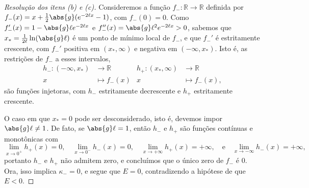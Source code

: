 \begin{proof}[Resolução dos itens (b) e (c)]
    Consideremos a função \(f_- : \mathbb{R} \to \mathbb{R}\) definida por \(f_-(x) = x + \frac12\abs{g}(e^{-2\ell x}- 1)\), com \(f_-(0) = 0\). Como \(f'_-(x) = 1 - \abs{g} \ell e^{-2 \ell x}\) e \(f_-''(x) = \abs{g} \ell^2 e^{-2 \ell x} > 0\), sabemos que \(x_* = \frac{1}{2\ell}\ln(\abs{g} \ell)\) é um ponto de mínimo local de \(f_-\), e que \(f_-'\) é estritamente crescente, com \(f_-'\) positiva em \((x_*, \infty)\) e negativa em \((-\infty, x_*)\). Isto é, as restrições de \(f_-\) a esses intervalos,
    \begin{align*}
        h_- : (-\infty, x_*) &\to \mathbb{R} &
        h_+ : (x_*, \infty) &\to \mathbb{R}\\
                          x &\mapsto f_-(x)&
                          x &\mapsto f_-(x),
    \end{align*}
    são funções injetoras, com \(h_-\) estritamente decrescente e \(h_+\) estritamente crescente.

    O caso em que \(x_* = 0\) pode ser desconsiderado, isto é, devemos impor \(\abs{g} \ell \neq 1\). De fato, se \(\abs{g}\ell = 1\), então \(h_-\) e \(h_+\) são funções contínuas e monotônicas com
    \begin{equation*}
        \lim_{x \to 0^+}{h_+(x)} = 0,\quad
        \lim_{x \to 0^-}{h_-(x)} = 0,\quad
        \lim_{x \to +\infty}{h_+(x)} = +\infty,\quad\text{e}\quad
        \lim_{x \to -\infty}{h_-(x)} = +\infty,
    \end{equation*}
    portanto \(h_-\) e \(h_+\) não admitem zero, e concluímos que o único zero de \(f_-\) é 0. Ora, isso implica \(\kappa_- = 0\), e segue que \(E = 0\), contradizendo a hipótese de que \(E < 0\).


\end{proof}
